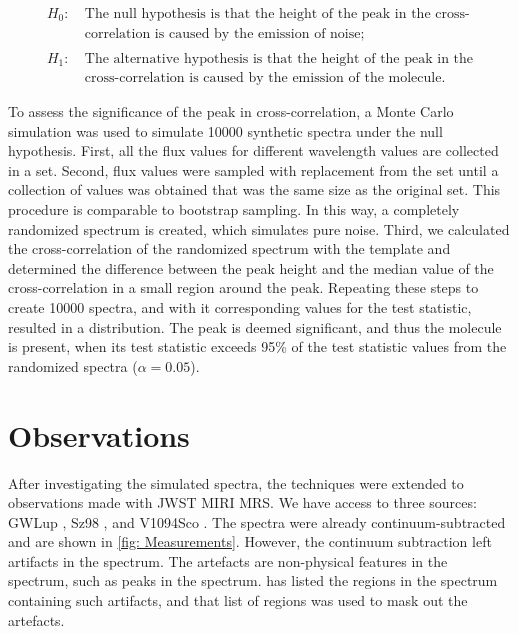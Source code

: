 \documentclass[oneside, single, authoryear, semicolon, 12pt]{lion-msc}
\newcommand{\4}{$_4$}
\newcommand{\3}{$_3$}
\newcommand{\2}{$_2$}
\begin{document}
\[
\begin{aligned}
H_0: &\ \text{The null hypothesis is that the height of the peak in the cross-} \\
     &\ \text{correlation is caused by the emission of noise;}\\
     \\
H_1: &\ \text{The alternative hypothesis is that the height of the peak in the} \\
     &\ \text{cross-correlation is caused by the emission of the molecule.}
\end{aligned}
\]

To assess the significance of the peak in cross-correlation, a Monte Carlo simulation was used to simulate 10000 synthetic spectra under the null hypothesis. First, all the flux values for different wavelength values are collected in a set. Second, flux values were sampled with replacement from the set until a collection of values was obtained that was the same size as the original set. This procedure is comparable to bootstrap sampling. In this way, a completely randomized spectrum is created, which simulates pure noise. Third, we calculated the cross-correlation of the randomized spectrum with the template and determined the difference between the peak height and the median value of the cross-correlation in a small region around the peak. Repeating these steps to create 10000 spectra, and with it corresponding values for the test statistic, resulted in a distribution. The peak is deemed significant, and thus the molecule is present, when its test statistic exceeds 95\% of the test statistic values from the randomized spectra ($\alpha=0.05$).

\newpage
\section{Observations}
After investigating the simulated spectra, the techniques were extended to observations made with JWST MIRI MRS. We have access to three sources: GWLup \citep{Gasman_2023}, Sz98 \citep{Grant_2023}, and V1094Sco \citep{taboneinprepp}. The spectra were already continuum-subtracted and are shown in \autoref{fig: Measurements}. However, the continuum subtraction left artifacts in the spectrum. The artefacts are non-physical features in the spectrum, such as peaks in the spectrum. \cite{Grant_2023} has listed the regions in the spectrum containing such artifacts, and that list of regions was used to mask out the artefacts. 
\end{document}

